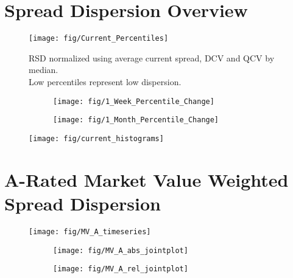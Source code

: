 \documentclass[12pt]{article}
\begin{document}
\section{Spread Dispersion Overview}
\begin{figure}[H]
	\centering
	\texttt{[image: fig/Current\_Percentiles]}
	\caption{RSD normalized using average current spread, DCV and QCV by median.\\ Low percentiles represent low dispersion.}
\end{figure}

\begin{figure}[H]
	\begin{subfigure}[t]{0.48\textwidth}
		\centering
		\texttt{[image: fig/1\_Week\_Percentile\_Change]}
	\end{subfigure}
	\hfill
	\begin{subfigure}[t]{0.48\textwidth}
		\centering
		\texttt{[image: fig/1\_Month\_Percentile\_Change]}
	\end{subfigure}
\end{figure}
\vfill
\begin{figure}[H]
	\centering
	\texttt{[image: fig/current\_histograms]}
\end{figure}
\vfill
\pagebreak


\section{A-Rated Market Value Weighted Spread Dispersion}
\begin{figure}[H]
	\centering
	\texttt{[image: fig/MV\_A\_timeseries]}
\end{figure}
\begin{figure}[H]
	\begin{subfigure}[t]{0.48\textwidth}
		\centering
		\texttt{[image: fig/MV\_A\_abs\_jointplot]}
	\end{subfigure}
	\hfill
	\begin{subfigure}[t]{0.48\textwidth}
		\centering
		\texttt{[image: fig/MV\_A\_rel\_jointplot]}
	\end{subfigure}
\end{figure}
\pagebreak
\end{document}

